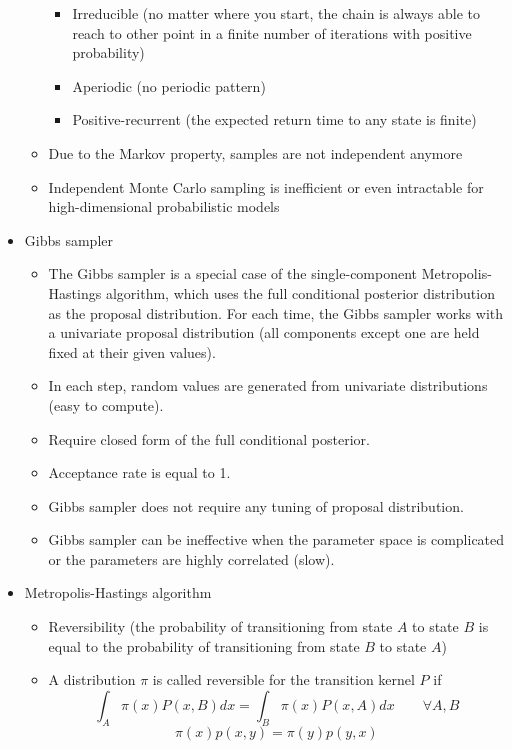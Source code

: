 \documentclass[a4paper]{article}
\begin{document}
\begin{itemize}
\begin{itemize}
\begin{itemize}
            \item Irreducible (no matter where you start, the chain is always able to reach to other point in a finite number of iterations with positive probability)
            \item Aperiodic (no periodic pattern)
            \item Positive-recurrent (the expected return time to any state is finite)
        \end{itemize}
        \item Due to the Markov property, samples are not independent anymore
        \item Independent Monte Carlo sampling is inefficient or even intractable for high-dimensional probabilistic models
    \end{itemize}
    \item Gibbs sampler
    \begin{itemize}
        \item The Gibbs sampler is a special case of the single-component Metropolis-Hastings algorithm, which uses the full conditional posterior distribution as the proposal distribution. For each time, the Gibbs sampler works with a univariate proposal distribution (all components except one are held fixed at their given values).
        \item In each step, random values are generated from univariate distributions (easy to compute).
        \item Require closed form of the full conditional posterior.
        \item Acceptance rate is equal to 1.
        \item Gibbs sampler does not require any tuning of proposal distribution.
        \item Gibbs sampler can be ineffective when the parameter space is complicated or the parameters are highly correlated (slow).
    \end{itemize}
    \item Metropolis-Hastings algorithm
    \begin{itemize}
        \item Reversibility (the probability of transitioning from state $A$ to state $B$ is equal to the probability of transitioning from state $B$ to state $A$)
        \item A distribution $\pi$ is called reversible for the transition kernel $P$ if
        \[\int_A\pi(x)P(x, B)dx=\int_B\pi(x)P(x,A)dx \qquad\forall A, B \]
        \[\pi(x)p(x,y)=\pi(y)p(y,x) \]

\end{itemize}
\end{itemize}
\end{document}
